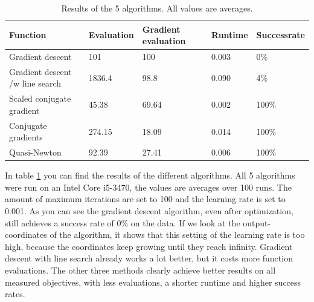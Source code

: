 \documentclass{article}
\begin{document}
\begin{table}[H]
	\centering
	\begin{tabular}{| l | l | l | l | l |}
		\hline
		Function                        & Evaluation  & Gradient evaluation & Runtime & Successrate \\ \hline 
		Gradient descent                & 101         & 100  & 0.003          & 0\% \\ \hline
		Gradient descent /w line search & 1836.4      & 98.8   & 0.090          & 4\% \\ \hline
		Scaled conjugate gradient       & 45.38        & 69.64  & 0.002  & 100\% \\ \hline
		Conjugate gradients             & 274.15        & 18.09 & 0.014        & 100\% \\ \hline
		Quasi-Newton                    & 92.39        & 27.41 & 0.006  & 100\% \\ \hline
	\end{tabular}
	\caption{Results of the 5 algorithms. All values are averages.}
	\label{tab:results}
\end{table}

In table \ref{tab:results} you can find the results of the different algorithms. All 5 algorithms were run on an Intel Core i5-3470, the values are averages over 100 runs. 
The amount of maximum iterations are set to 100 and the learning rate is set to 0.001.
As you can see the gradient descent algorithm, even after optimization, still achieves a success rate of 0\% on the data. If we look at the output-coordinates of the algorithm, it shows that this setting of the learning rate is too high, because the coordinates keep growing until they reach infinity. Gradient descent with line search already works a lot better, but it costs more function evaluations. The other three methods clearly achieve better results on all measured objectives, with less evaluations, a shorter runtime and higher success rates.
\end{document}
